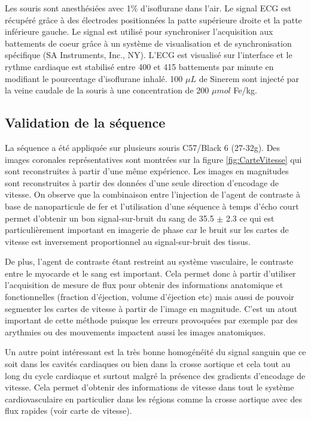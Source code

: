 Les souris sont anesthésiées avec 1$\%$ d'isoflurane dans l'air. Le signal ECG est récupéré grâce à des électrodes positionnées la patte supérieure droite et la patte inférieure gauche. Le signal est utilisé pour synchroniser l'acquisition aux battements de coeur grâce à un système de visualisation et de synchronisation spécifique (SA Instruments, Inc., NY). L'ECG est visualisé sur l'interface et le rythme cardiaque est stabilisé entre 400 et 415 battements par minute en modifiant le pourcentage d'isoflurane inhalé. 100 $\mu L$ de Sinerem sont injecté par la veine caudale de la souris à une concentration de 200 $\mu mol$ Fe/kg.

\subsection{Validation de la séquence}

La séquence a été appliquée sur plusieurs souris C57/Black 6 (27-32g). Des images coronales représentatives sont montrées sur la figure \ref{fig:CarteVitesse} qui sont reconstruites à partir d'une même expérience. Les images en magnitudes sont reconstruites à partir des données d'une seule direction d'encodage de vitesse.  On observe que la combinaison entre l'injection de l'agent de contraste à base de nanoparticule de fer et l'utilisation d'une séquence à temps d'écho court permet d'obtenir un bon signal-sur-bruit du sang de 35.5 $\pm$ 2.3 ce qui est particulièrement important en imagerie de phase car le bruit sur les cartes de vitesse est inversement proportionnel au signal-sur-bruit des tissus. 

De plus, l'agent de contraste étant restreint au système vasculaire, le contraste entre le myocarde et le sang est important. Cela permet donc à partir d'utiliser l'acquisition de mesure de flux pour obtenir des informations anatomique et fonctionnelles (fraction d'éjection, volume d'éjection etc) mais aussi de pouvoir segmenter les cartes de vitesse à partir de l'image en magnitude. C'est un atout important de cette méthode puisque les erreurs provoquées par exemple par des arythmies ou des mouvements impactent aussi les images anatomiques.

Un autre point intéressant est la très bonne homogénéité du signal sanguin que ce soit dans les cavités cardiaques ou bien dans la crosse aortique et cela tout au long du cycle cardiaque et surtout malgré la présence des gradients d'encodage de vitesse. Cela permet d'obtenir des informations de vitesse dans tout le système cardiovasculaire en particulier dans les régions comme la crosse aortique avec des flux rapides (voir carte de vitesse).

